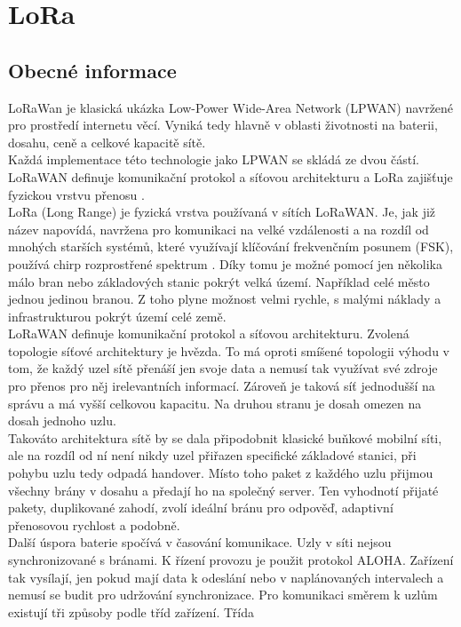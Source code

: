 \documentclass{ctuthesis}
\begin{document}
\section{LoRa}
\subsection{Obecné informace}
LoRaWan je klasická ukázka Low-Power Wide-Area Network (LPWAN) navržené pro
prostředí internetu věcí. Vyniká tedy hlavně v oblasti životnosti na baterii, dosahu, ceně a
celkové kapacitě sítě. \\
Každá implementace této technologie jako LPWAN se skládá ze dvou částí. LoRaWAN
definuje komunikační protokol a síťovou architekturu a LoRa zajišťuje fyzickou vrstvu přenosu
\cite{loraalliance}.\\
LoRa (Long Range) je fyzická vrstva používaná v sítích LoRaWAN. Je, jak již název napovídá,
navržena pro komunikaci na velké vzdálenosti a na rozdíl od mnohých starších systémů, které
využívají klíčování frekvenčním posunem (FSK), používá chirp rozprostřené spektrum \cite{loraalliance2}.
Díky tomu je možné pomocí jen několika málo bran nebo základových stanic pokrýt velká
území. Například celé město jednou jedinou branou. Z toho plyne možnost velmi rychle,
s malými náklady a infrastrukturou pokrýt území celé země.\\
LoRaWAN definuje komunikační protokol a síťovou architekturu. Zvolená topologie síťové
architektury je hvězda. To má oproti smíšené topologii výhodu v tom, že každý uzel sítě přenáší
jen svoje data a nemusí tak využívat své zdroje pro přenos pro něj irelevantních informací.
Zároveň je taková síť jednodušší na správu a má vyšší celkovou kapacitu. Na druhou stranu je
dosah omezen na dosah jednoho uzlu.\\
Takováto architektura sítě by se dala připodobnit klasické buňkové mobilní síti, ale na rozdíl
od ní není nikdy uzel přiřazen specifické základové stanici, při pohybu uzlu tedy odpadá
handover. Místo toho paket z každého uzlu přijmou všechny brány v dosahu a předají ho na
společný server. Ten vyhodnotí přijaté pakety, duplikované zahodí, zvolí ideální bránu pro
odpověď, adaptivní přenosovou rychlost a podobně.\\
Další úspora baterie spočívá v časování komunikace. Uzly v síti nejsou synchronizované
s bránami. K řízení provozu je použit protokol ALOHA. Zařízení tak vysílají, jen pokud mají
data k odeslání nebo v naplánovaných intervalech a nemusí se budit pro udržování
synchronizace. Pro komunikaci směrem k uzlům existují tři způsoby podle tříd zařízení. Třída
\end{document}
